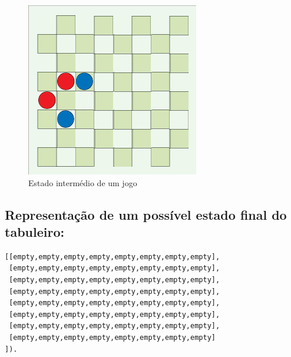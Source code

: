 \documentclass[a4paper,11pt,titlepage]{article}
\begin{document}
\begin{figure}[H]
    \center
    \includegraphics[scale=0.8]{res/intermediate-state.jpg}
    \caption{Estado intermédio de um jogo}
    \label{intermediate-state.jpg}
\end{figure}

\subsection{Representação de um possível estado final do tabuleiro:}
\begin{verbatim}
[[empty,empty,empty,empty,empty,empty,empty,empty],
 [empty,empty,empty,empty,empty,empty,empty,empty],
 [empty,empty,empty,empty,empty,empty,empty,empty],
 [empty,empty,empty,empty,empty,empty,empty,empty],
 [empty,empty,empty,empty,empty,empty,empty,empty],
 [empty,empty,empty,empty,empty,empty,empty,empty],
 [empty,empty,empty,empty,empty,empty,empty,empty],
 [empty,empty,empty,empty,empty,empty,empty,empty]
]).
\end{verbatim}
\end{document}
